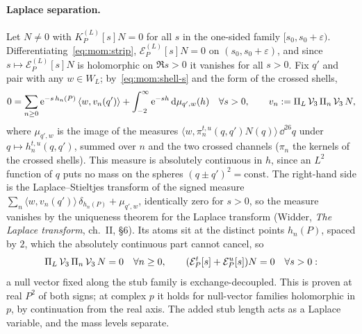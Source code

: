 \paragraph{Laplace separation.}
Let $N \ne 0$ with $K^{(L)}_P[s] N = 0$ for all $s$ in the one-sided family $[s_0, s_0 + \varepsilon)$.
Differentiating~\eqref{eq:mom:strip}, $\mathcal E^{(L)}_P[s] N = 0$ on $(s_0, s_0 + \varepsilon)$, and since $s \mapsto \mathcal E^{(L)}_P[s] N$ is holomorphic on $\Re s > 0$ it vanishes for all $s > 0$.
Fix $q'$ and pair with any $w \in W_L$; by~\eqref{eq:mom:shell-s} and the form of the crossed shells,
\begin{equation}
  \label{eq:mom:laplace}
  0
    = \sum_{n \ge 0} \mathrm{e}^{- s \, h_n(P)} \, \langle w, v_n(q') \rangle + \int_{-2}^\infty \mathrm{e}^{- s h} \, \mathrm{d} \mu_{q', w}(h)
  \quad \forall s > 0,
  \qquad
  v_n
    := \Pi_L \, \mathcal{V}_{3} \, \Pi_n \, \mathcal{V}_{3} \, N,
\end{equation}
where $\mu_{q', w}$ is the image of the measures $\langle w, \pi^{t, u}_n(q, q') N(q) \rangle \, \dd^{26} q$ under $q \mapsto h^{t, u}_n(q, q')$, summed over $n$ and the two crossed channels ($\pi_n$ the kernels of the crossed shells).
This measure is absolutely continuous in $h$, since an $L^2$ function of $q$ puts no mass on the spheres $(q \pm q')^2 = \text{const}$.
The right-hand side is the Laplace--Stieltjes transform of the signed measure $\sum_n \langle w, v_n(q') \rangle \, \delta_{h_n(P)} + \mu_{q', w}$, identically zero for $s > 0$, so the measure vanishes by the uniqueness theorem for the Laplace transform (Widder, \emph{The Laplace transform}, ch.~II, §6).
Its atoms sit at the distinct points $h_n(P)$, spaced by $2$, which the absolutely continuous part cannot cancel, so
\begin{equation}
  \label{eq:mom:decoupled}
  \Pi_L \, \mathcal{V}_{3} \, \Pi_n \, \mathcal{V}_{3} \, N
    = 0
  \quad \forall n \ge 0,
  \qquad
  (\mathcal E^t_P[s] + \mathcal E^u_P[s]) N
    = 0
  \quad \forall s > 0:
\end{equation}
a null vector fixed along the stub family is exchange-decoupled.
This is proven at real $P^2$ of both signs; at complex $p$ it holds for null-vector families holomorphic in $p$, by continuation from the real axis.
The added stub length acts as a Laplace variable, and the mass levels separate.

